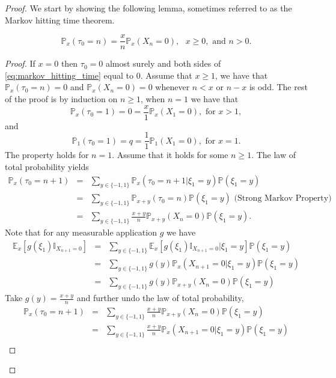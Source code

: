 \begin{proof}
We start by showing the following lemma, sometimes referred to as the Markov hitting time theorem.
\begin{lemma}\label{lem:markov_hitting_time}
\begin{equation}\label{eq:markov_hitting_time}
\mathbb{P}_x(\tau_0 = n) = \frac{x}{n}\mathbb{P}_x(X_n = 0),\text{ }x\geq 0,\text{ and }n> 0.
\end{equation}
\end{lemma}
\begin{proof}
If $x = 0$ then $\tau_0 = 0$ almost surely and both sides of \eqref{eq:markov_hitting_time} equal to $0$. Assume that $x\geq1$, we have that $\mathbb{P}_x(\tau_0 = n) = 0$ and $\mathbb{P}_x(X_n = 0) = 0$ whenever $n<x$ or $n-x$ is odd. The rest of the proof is by induction on $n\geq1$, when $n = 1$ we have that 
$$
\mathbb{P}_x(\tau_0 = 1) = 0 = \frac{x}{1}\mathbb{P}_x(X_1 = 0),\text{ for }x>1, 
$$
and 
$$\mathbb{P}_1(\tau_0 = 1) = q = \frac{1}{1}\mathbb{P}_1(X_1 = 0),\text{ for }x=1. 
$$
The property holds for $n=1$. Assume that it holds for some $n\geq1$. The law of total probability yields
\begin{eqnarray*}
\mathbb{P}_x(\tau_0 = n+1)&=&\sum_{y\in\{-1,1\}}\mathbb{P}_x(\tau_0 = n+1|\xi_1 = y)\mathbb{P}(\xi_1 = y)\\
&=&\sum_{y\in\{-1,1\}}\mathbb{P}_{x+y}(\tau_0 = n)\mathbb{P}(\xi_1 = y) \text{ (Strong Markov Property)}\\
&=&\sum_{y\in\{-1,1\}}\frac{x+y}{n}\mathbb{P}_{x+y}(X_n = 0)\mathbb{P}(\xi_1 = y).
\end{eqnarray*}
 Note that for any measurable application $g$ we have
\begin{eqnarray*}
\mathbb{E}_x[g(\xi_1)\mathbb{I}_{X_{n+1}=0}]&=&\sum_{y\in\{-1,1\}}\mathbb{E}_x[g(\xi_1)\mathbb{I}_{X_{n+1}=0}|\xi_1 = y]\mathbb{P}(\xi_1=y)\\
&=&\sum_{y\in\{-1,1\}}g(y)\mathbb{P}_x(X_{n+1}=0|\xi_1 = y)\mathbb{P}(\xi_1=y)\\
&=&\sum_{y\in\{-1,1\}}g(y)\mathbb{P}_{x+y}(X_{n}=0)\mathbb{P}(\xi_1=y)
\end{eqnarray*}
Take $g(y) = \frac{x+y}{n}$ and further undo the law of total probability, 
\begin{eqnarray}
\mathbb{P}_x(\tau_0 = n+1)&=&\sum_{y\in\{-1,1\}}\frac{x+y}{n}\mathbb{P}_{x+y}(X_n = 0)\mathbb{P}(\xi_1 = y)\nonumber\\
&=&\sum_{y\in\{-1,1\}}\frac{x+y}{n}\mathbb{P}_{x}(X_{n+1} = 0|\xi_1 = y)\mathbb{P}(\xi_1 = y)\nonumber\\

\end{eqnarray}
\end{proof}
\end{proof}
